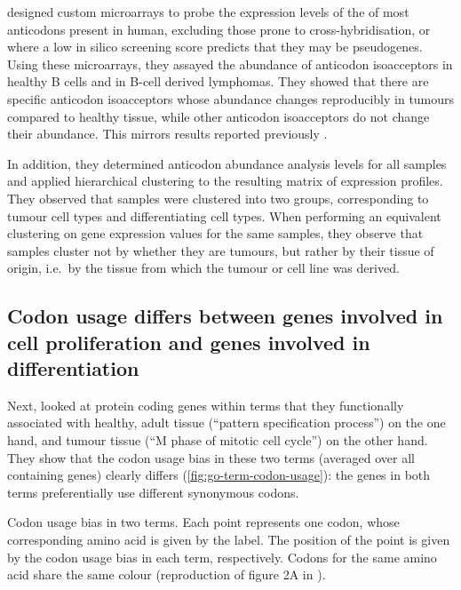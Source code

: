 \citet{Gingold:2014} designed custom microarrays to probe the expression levels
of the \trna[s] of most anticodons present in human, excluding those prone to
cross-hybridi\-sation, or where a low in silico screening score predicts that
they may be pseudogenes. Using these microarrays, they assayed the abundance of
anticodon isoacceptors in healthy B cells and in B-cell derived lymphomas. They
showed that there are specific anticodon isoacceptors whose abundance changes
reproducibly in tumours compared to healthy tissue, while other anticodon
isoacceptors do not change their abundance. This mirrors results reported
previously \citep{Pavon-Eternod:2009}.

In addition, they determined \trna anticodon abundance analysis levels for all
samples and applied hierarchical clustering to the resulting matrix of \trna
expression profiles. They observed that samples were clustered into two groups,
corresponding to tumour cell types and differentiating cell types. When
performing an equivalent clustering on \mrna gene expression values for the same
samples, they observe that samples cluster not by whether they are tumours, but
rather by their tissue of origin, i.e.\ by the tissue from which the tumour or
cell line was derived.

\subsection{Codon usage differs between genes involved in cell proliferation and
genes involved in differentiation}

Next, \citet{Gingold:2014} looked at protein coding genes within \go terms that
they functionally associated with healthy, adult tissue (“pattern specification
process”) on the one hand, and tumour tissue (“M phase of mitotic cell cycle”)
on the other hand. They show that the codon usage bias in these two \go terms
(averaged over all containing genes) clearly differs
(\cref{fig:go-term-codon-usage}): the genes in both \go terms preferentially use
different synonymous codons.

    {Codon usage bias in two  terms.}
    {Each point represents one codon, whose corresponding amino acid is given by
    the label. The position of the point is given by the codon usage bias in
    each \go term, respectively. Codons for the same amino acid share the same
    colour (reproduction of figure 2A in \citet{Gingold:2014}).}

